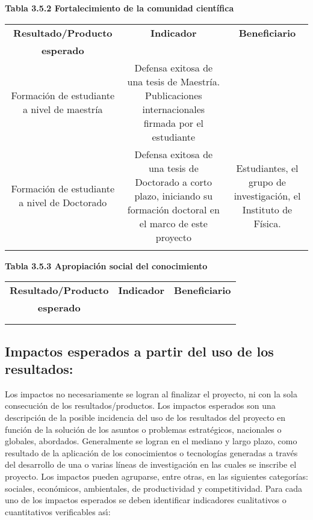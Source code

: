 \begin{ideas}
\textbf{Tabla 3.5.2 Fortalecimiento de la comunidad científica}\\
\begin{tabular}{|c|c|c|}\hline
   \textbf{Resultado/Producto}&\textbf{Indicador} & \textbf{Beneficiario}\\
   \textbf{esperado}& & \\\hline
 \parbox[t]{4cm}{Formación de estudiante a nivel de maestría} &\parbox[t]{4cm}{Defensa exitosa de una tesis de Maestría. Publicaciones internacionales firmada por el estudiante} & \\\hline 
\parbox[t]{4cm}{Formación de estudiante a nivel de Doctorado}  & \parbox[t]{4cm}{Defensa exitosa de una tesis de Doctorado a corto plazo, iniciando su formación doctoral en el marco de este proyecto}& \parbox[t]{4cm}{Estudiantes, el grupo de investigación, el Instituto de Física.} \\\hline
\parbox[t]{4cm}{}  & \parbox[t]{4cm}{}& \parbox[t]{4cm}{} \\\hline
 \end{tabular}

\textbf{Tabla 3.5.3 Apropiación social del conocimiento}\\
\begin{tabular}{|c|c|c|}\hline
   \textbf{Resultado/Producto}&\textbf{Indicador} & \textbf{Beneficiario}\\
   \textbf{esperado}& & \\\hline
\parbox[t]{4cm}{}  & \parbox[t]{4cm}{}& \parbox[t]{4cm}{} \\\hline
   & & \\\hline
 \end{tabular}


\subsection{Impactos esperados a partir del uso de los resultados:}

\begin{instrucciones}
  Los impactos no necesariamente se logran al finalizar el proyecto, ni
con la sola consecución de los resultados/productos. Los impactos
esperados son una descripción de la posible incidencia del uso de los
resultados del proyecto en función de la solución de los asuntos o
problemas estratégicos, nacionales o globales, abordados. Generalmente
se logran en el mediano y largo plazo, como resultado de la aplicación
de los conocimientos o tecnologías generadas a través del desarrollo
de una o varias líneas de investigación en las cuales se inscribe el
proyecto. Los impactos pueden agruparse, entre otras, en las
siguientes categorías: sociales, económicos, ambientales, de
productividad y competitividad. Para cada uno de los impactos
esperados se deben identificar indicadores cualitativos o
cuantitativos verificables as\'\i:
\end{instrucciones}


\end{ideas}
